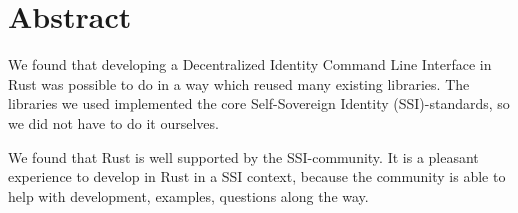 \chapter*{Abstract}

We found that developing a Decentralized Identity Command Line Interface in Rust was possible to do in a way which reused many existing libraries. The libraries we used implemented the core Self-Sovereign Identity (SSI)-standards, so we did not have to do it ourselves.

We found that Rust is well supported by the SSI-community. It is a pleasant experience to develop in Rust in a SSI context, because the community is able to help with development, examples, questions along the way.
